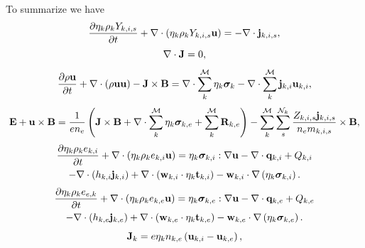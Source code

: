 \documentclass[a4paper,11pt]{report}
\begin{document}
To summarize we have
\begin{equation}
    \label{eq:sf_mm_ms_ni_final}
    \frac{\partial \eta_k \rho_k Y_{k,i,s}}{\partial t} + \nabla \cdot \left( \eta_k \rho_k Y_{k,i,s} \mathbf{u} \right) = -\nabla \cdot \mathbf{j}_{k,i,s},
\end{equation}
\begin{equation}
    \label{eq:sf_mm_ms_ne_final}
    \nabla \cdot \mathbf{J} = 0,
\end{equation}
\begin{equation}
    \label{eq:sf_mm_ms_ui_final}
    \frac{\partial \rho \mathbf{u}}{\partial t} + \nabla \cdot \left( \rho \mathbf{u} \mathbf{u} \right) - \mathbf{J} \times \mathbf{B} = \nabla \cdot \sum_k^\mathcal{M} \eta_k \bm \sigma_k - \nabla \cdot \sum_k^\mathcal{M} \mathbf{j}_{k,i} \mathbf{u}_{k,i},
\end{equation}
\begin{equation}
    \label{eq:sf_mm_ms_ue_final}
    \mathbf{E} + \mathbf{u} \times \mathbf{B} = \frac{1}{e n_e} \left( \mathbf{J} \times \mathbf{B} + \nabla \cdot \sum_k^\mathcal{M} \eta_k \bm \sigma_{k,e} + \sum_k^\mathcal{M} \mathbf{R}_{k,e} \right) - \sum_k^\mathcal{M} \sum_s^{\mathcal{N}_k} \frac{Z_{k,i,s} \mathbf{j}_{k,i,s}}{n_e m_{k,i,s}} \times \mathbf{B},
\end{equation}
\begin{multline}
    \label{eq:sf_mm_ms_iei_final}
    \frac{\partial \eta_k \rho_k e_{k,i}}{\partial t} + \nabla \cdot \left( \eta_k \rho_k e_{k,i} \mathbf{u} \right) = \eta_k \bm \sigma_{k,i} : \nabla \mathbf{u} - \nabla \cdot \mathbf{q}_{k,i} + Q_{k,i} \\
    - \nabla \cdot \left( h_{k,i} \mathbf{j}_{k,i} \right) + \nabla \cdot \left( \mathbf{w}_{k,i} \cdot \eta_k \mathbf{t}_{k,i} \right) - \mathbf{w}_{k,i} \cdot \nabla \left( \eta_k \bm \sigma_{k,i} \right).
\end{multline}
\begin{multline}
    \label{eq:sf_mm_ms_iee_final}
    \frac{\partial \eta_k \rho_k e_{e,k}}{\partial t} + \nabla \cdot \left( \eta_k \rho_k e_{k,e} \mathbf{u} \right) = \eta_k \bm \sigma_{k,e} : \nabla \mathbf{u} - \nabla \cdot \mathbf{q}_{k,e} + Q_{k,e} \\
    - \nabla \cdot \left( h_{k,e} \mathbf{j}_{k,e} \right) + \nabla \cdot \left( \mathbf{w}_{k,e} \cdot \eta_k \mathbf{t}_{k,e} \right) - \mathbf{w}_{k,e} \cdot \nabla \left( \eta_k \bm \sigma_{k,e} \right).
\end{multline}
\begin{equation}
    \label{eq:sf_mm_ms_curr_density_final}
    \mathbf{J}_k = e \eta_k n_{k,e} \left( \mathbf{u}_{k,i} - \mathbf{u}_{k,e} \right),
\end{equation}
\end{document}
